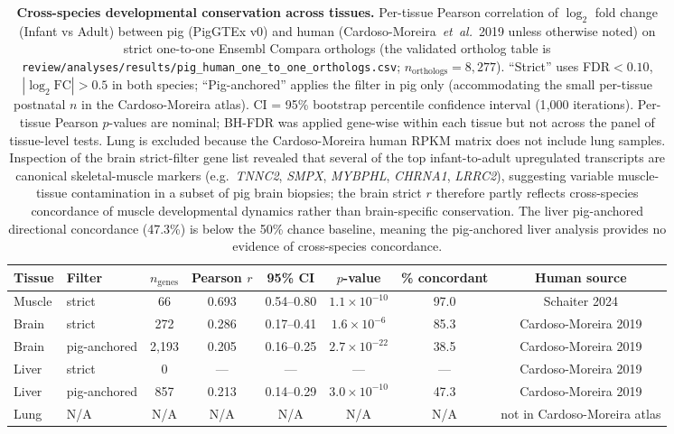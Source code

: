 \documentclass[10pt,a4paper]{article}
\begin{document}
\begin{table}[H]
  \centering
  \caption{\textbf{Cross-species developmental conservation across tissues.} Per-tissue Pearson correlation of $\log_2$ fold change (Infant vs Adult) between pig (PigGTEx v0) and human (Cardoso-Moreira~\textit{et~al.}~2019 unless otherwise noted) on strict one-to-one Ensembl Compara orthologs (the validated ortholog table is \texttt{review/analyses/results/pig\_human\_one\_to\_one\_orthologs.csv}; $n_{\text{orthologs}} = 8{,}277$). ``Strict'' uses FDR$<0.10$, $|\log_2\mathrm{FC}|>0.5$ in both species; ``Pig-anchored'' applies the filter in pig only (accommodating the small per-tissue postnatal $n$ in the Cardoso-Moreira atlas). CI = 95\% bootstrap percentile confidence interval (1{,}000 iterations). Per-tissue Pearson $p$-values are nominal; BH-FDR was applied gene-wise within each tissue but not across the panel of tissue-level tests. Lung is excluded because the Cardoso-Moreira human RPKM matrix does not include lung samples. Inspection of the brain strict-filter gene list revealed that several of the top infant-to-adult upregulated transcripts are canonical skeletal-muscle markers (e.g.\ \textit{TNNC2}, \textit{SMPX}, \textit{MYBPHL}, \textit{CHRNA1}, \textit{LRRC2}), suggesting variable muscle-tissue contamination in a subset of pig brain biopsies; the brain strict $r$ therefore partly reflects cross-species concordance of muscle developmental dynamics rather than brain-specific conservation. The liver pig-anchored directional concordance (47.3\%) is below the 50\% chance baseline, meaning the pig-anchored liver analysis provides no evidence of cross-species concordance.}
  \label{tab:S8}
  \footnotesize
  \setlength{\tabcolsep}{4pt}
  \begin{tabular}{llcccccc}
    \toprule
    Tissue & Filter & $n_{\text{genes}}$ & Pearson $r$ & 95\% CI & $p$-value & \% concordant & Human source \\
    \midrule
    Muscle & strict & 66 & 0.693 & 0.54--0.80 & $1.1\times 10^{-10}$ & 97.0 & Schaiter 2024 \\
    \midrule
    Brain & strict & 272 & 0.286 & 0.17--0.41 & $1.6\times 10^{-6}$ & 85.3 & Cardoso-Moreira 2019 \\
    Brain & pig-anchored & 2{,}193 & 0.205 & 0.16--0.25 & $2.7\times 10^{-22}$ & 38.5 & Cardoso-Moreira 2019 \\
    \midrule
    Liver & strict & 0 & --- & --- & --- & --- & Cardoso-Moreira 2019 \\
    Liver & pig-anchored & 857 & 0.213 & 0.14--0.29 & $3.0\times 10^{-10}$ & 47.3 & Cardoso-Moreira 2019 \\
    \midrule
    Lung & N/A & N/A & N/A & N/A & N/A & N/A & not in Cardoso-Moreira atlas \\
    \bottomrule
  \end{tabular}
\end{table}
\end{document}
